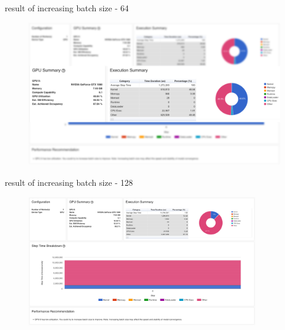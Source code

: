 \documentclass[compress,aspectratio=169]{beamer}
\begin{document}
\begin{frame}{result of increasing batch size - 64}
	\vspace{-1em}
\begin{center}
    \begin{figure}
        \includegraphics[width=1\textwidth]{../../data/scap_gtx1080_profiler-torch_batch-size-64_14629008_zoom}
    \end{figure}
    \end{center}

\end{frame}


\begin{frame}{result of increasing batch size - 128}
	\vspace{-1em}
\begin{center}
    \begin{figure}
        \includegraphics[width=0.9\textwidth]{../../data/scap_gtx1080_profiler-torch_batch-size-128_14633534}
    \end{figure}
    \end{center}

\end{frame}
\end{document}
